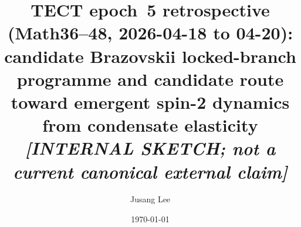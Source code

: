 



\title{TECT epoch~5 retrospective (Math36--48, 2026-04-18 to 04-20):
candidate Brazovskii locked-branch programme and candidate route
toward emergent spin-2 dynamics from condensate elasticity \\
\normalsize{\textit{[INTERNAL SKETCH; not a current canonical
external claim]}}}

\author{Jusang Lee}

\date{\today}

